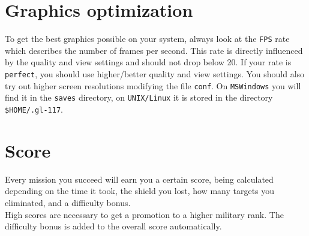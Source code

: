 \section{Graphics optimization}
\label{sec:graphics_optimization}

To get the best graphics possible on your system, always look at the
\texttt{FPS} rate which describes the number of frames per second.
This rate is directly influenced by the quality and view settings and
should not drop below 20. If your rate is \texttt{perfect}, you should
use higher/better quality and view settings.
You should also try out higher screen resolutions modifying the file
\texttt{conf}. On \texttt{MSWindows} you will find it in the \texttt{saves}
directory, on \texttt{UNIX/Linux} it is stored in the directory
\texttt{\$HOME/.gl-117}.


\section{Score}
\label{sec:score}

Every mission you succeed will earn you a certain score, being calculated
depending on the time it took, the shield you lost, how many targets you
eliminated, and a difficulty bonus.\\
High scores are necessary to get a promotion to a higher military rank.
The difficulty bonus is added to the overall score automatically.
